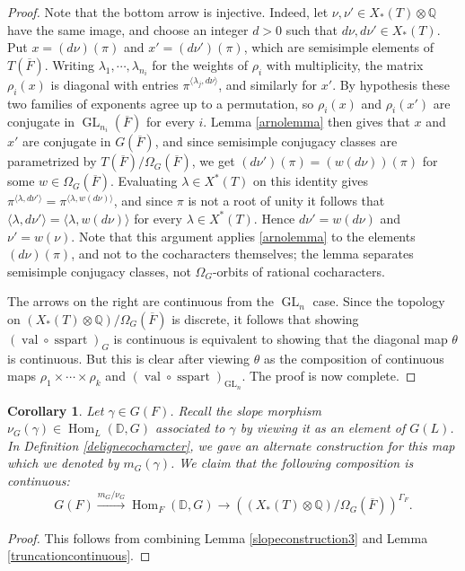 \documentclass[11pt,a4paper]{article}
\theoremstyle{definition}
\theoremstyle{plain}
\newtheorem{C}[shared]{Corollary}
\theoremstyle{remark}
\theoremstyle{plain}
\DeclareMathOperator{\Hom}{Hom}
\DeclareMathOperator{\GL}{GL}
\DeclareMathOperator{\val}{val}
\DeclareMathOperator{\semisimplepart}{sspart}
\begin{document}
\begin{proof}
    Note that the bottom arrow is injective. Indeed, let $\nu, \nu' \in X_*(T) \otimes \mathbb{Q}$ have the same image, and choose an integer $d > 0$ such that $d\nu, d\nu' \in X_*(T)$. Put $x = (d\nu)(\pi)$ and $x' = (d\nu')(\pi)$, which are semisimple elements of $T(\overline{F})$. Writing $\lambda_1, \cdots, \lambda_{n_i}$ for the weights of $\rho_i$ with multiplicity, the matrix $\rho_i(x)$ is diagonal with entries $\pi^{\langle \lambda_j, d\nu \rangle}$, and similarly for $x'$. By hypothesis these two families of exponents agree up to a permutation, so $\rho_i(x)$ and $\rho_i(x')$ are conjugate in $\GL_{n_i}(\overline{F})$ for every $i$. Lemma \ref{arnolemma} then gives that $x$ and $x'$ are conjugate in $G(\overline{F})$, and since semisimple conjugacy classes are parametrized by $T(\overline{F})/\Omega_G(\overline{F})$, we get $(d\nu')(\pi) = (w(d\nu))(\pi)$ for some $w \in \Omega_G(\overline{F})$. Evaluating $\lambda \in X^*(T)$ on this identity gives $\pi^{\langle \lambda, d\nu' \rangle} = \pi^{\langle \lambda, w(d\nu) \rangle}$, and since $\pi$ is not a root of unity it follows that $\langle \lambda, d\nu' \rangle = \langle \lambda, w(d\nu) \rangle$ for every $\lambda \in X^*(T)$. Hence $d\nu' = w(d\nu)$ and $\nu' = w(\nu)$. Note that this argument applies \ref{arnolemma} to the elements $(d\nu)(\pi)$, and not to the cocharacters themselves; the lemma separates semisimple conjugacy classes, not $\Omega_G$-orbits of rational cocharacters. 

    The arrows on the right are continuous from the $\GL_n$ case. Since the topology on $(X_*(T) \otimes \mathbb{Q})/\Omega_G(\overline{F})$ is discrete, it follows that showing $(\val \circ \semisimplepart)_G$ is continuous is equivalent to showing that the diagonal map $\theta$ is continuous. But this is clear after viewing $\theta$ as the composition of continuous maps $\rho_1 \times \cdots \times \rho_k$ and $(\val \circ \semisimplepart)_{\GL_n}$. The proof is now complete.
\end{proof}

\begin{C}\label{continuousnewtonpoint}
    Let $\gamma \in G(F)$. Recall the slope morphism $\nu_G(\gamma) \in \Hom_L(\mathbb{D}, G)$ associated to $\gamma$ by viewing it as an element of $G(L)$. In Definition \ref{delignecocharacter}, we gave an alternate construction for this map which we denoted by $m_G(\gamma)$. We claim that the following composition is continuous:
    $$ G(F) \xrightarrow{m_G / \nu_G} \Hom_F(\mathbb{D}, G) \xrightarrow[]{} ((X_*(T) \otimes \mathbb{Q})/\Omega_G(\overline{F}))^{\Gamma_F}. $$
\end{C}
\begin{proof}
    This follows from combining Lemma \ref{slopeconstruction3} and Lemma \ref{truncationcontinuous}. 
\end{proof}
\end{document}
